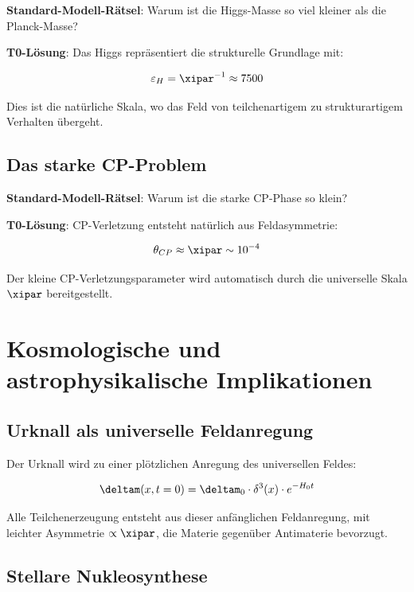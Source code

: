 	\textbf{Standard-Modell-Rätsel}: Warum ist die Higgs-Masse so viel kleiner als die Planck-Masse?
	
	\textbf{T0-Lösung}: Das Higgs repräsentiert die strukturelle Grundlage mit:
	
	\begin{equation}
		\varepsilon_H = \xipar^{-1} \approx 7500
		\label{eq:higgs_epsilon}
	\end{equation}
	
	Dies ist die natürliche Skala, wo das Feld von teilchenartigem zu strukturartigem Verhalten übergeht.
	
	\subsection{Das starke CP-Problem}
	
	\textbf{Standard-Modell-Rätsel}: Warum ist die starke CP-Phase so klein?
	
	\textbf{T0-Lösung}: CP-Verletzung entsteht natürlich aus Feldasymmetrie:
	
	\begin{equation}
		\theta_{CP} \approx \xipar \sim 10^{-4}
		\label{eq:cp_phase}
	\end{equation}
	
	Der kleine CP-Verletzungsparameter wird automatisch durch die universelle Skala $\xipar$ bereitgestellt.
	
	\section{Kosmologische und astrophysikalische Implikationen}
	
	\subsection{Urknall als universelle Feldanregung}
	
	Der Urknall wird zu einer plötzlichen Anregung des universellen Feldes:
	
	\begin{equation}
		\deltam(x,t=0) = \deltam_0 \cdot \delta^3(x) \cdot e^{-H_0 t}
		\label{eq:big_bang_field}
	\end{equation}
	
	Alle Teilchenerzeugung entsteht aus dieser anfänglichen Feldanregung, mit leichter Asymmetrie $\propto \xipar$, die Materie gegenüber Antimaterie bevorzugt.
	
	\subsection{Stellare Nukleosynthese}
	
